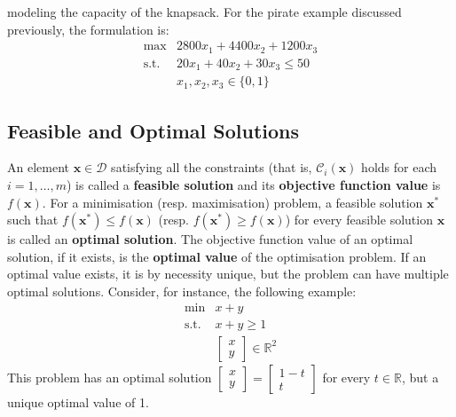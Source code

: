 modeling the capacity of the knapsack. For the pirate example discussed previously, the formulation is: \[\begin{array}{rl}
\max & 2800 x_1 + 4400 x_2 + 1200 x_3 \\
\mbox{s.t.} & 20 x_1 + 40 x_2 + 30 x_3 \leq 50\\
 & x_1, x_2, x_3 \in \{0,1\}
\end{array}\]
\subsection{Feasible and Optimal Solutions} An element \(\mathbf{x} \in \mathcal{D}\) satisfying all the constraints
(that is, \(\mathcal{C}_i(\mathbf{x})\) holds for each
\(i = 1,\ldots,m\)) is called a \textbf{feasible solution} and its
\textbf{objective function value} is \(f(\mathbf{x})\). For a minimisation (resp. maximisation) problem, a feasible solution
\(\mathbf{x}^*\) such that \(f(\mathbf{x}^*) \leq f(\mathbf{x})\)
(resp. \(f(\mathbf{x}^*) \geq f(\mathbf{x})\)) for every feasible solution
\(\mathbf{x}\) is called an \textbf{optimal solution}. The objective function value of an optimal solution, if it
exists, is the \textbf{optimal value} of the optimisation problem. \newl If an optimal value exists, it is by necessity unique, but the problem can have
multiple optimal solutions. Consider, for instance, the following example:
\[\begin{array}{rl}
\min & x+y \\
\mbox{s.t.} 
  & x+y \geq 1 \\
  & \begin{bmatrix} x \\ y \end{bmatrix} \in \mathbb{R}^2
\end{array}\] This problem has an optimal solution 
\(\begin{bmatrix} x \\ y \end{bmatrix} = \begin{bmatrix} 1-t \\ t \end{bmatrix}\)
 for every \(t \in \mathbb{R}\), but a unique optimal
value of 1.

